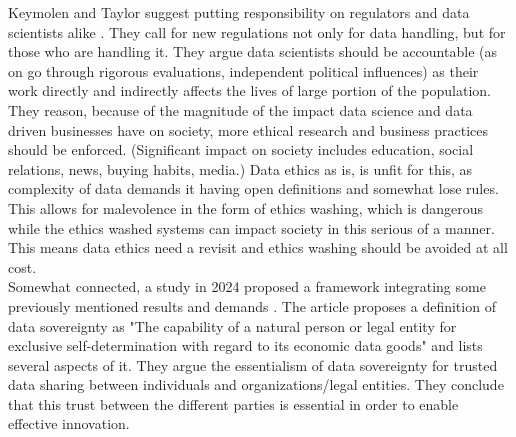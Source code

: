 \documentclass[english, 12pt, a4paper, sci, utf8, a-2b, online]{aaltothesis}
\theoremstyle{change}
\theoremstyle{theoremstyle}
\begin{document}
Keymolen and Taylor suggest putting responsibility on regulators and data scientists alike \cite{keymolen2023data}. They call for new regulations not only for data handling, but for those who are handling it. They argue data scientists should be accountable (as on go through rigorous evaluations, independent political influences) as their work directly and indirectly affects the lives of large portion of the population. They reason, because of the magnitude of the impact data science and data driven businesses have on society, more ethical research and business practices should be enforced. (Significant impact on society includes education, social relations, news, buying habits, media.) Data ethics as is, is unfit for this, as complexity of data demands it having open definitions and somewhat lose rules. This allows for malevolence in the form of ethics washing, which is dangerous while the ethics washed systems can impact society in this serious of a manner. This means data ethics need a revisit and ethics washing should be avoided at all cost.\\

Somewhat connected, a study in 2024 proposed a framework integrating some previously mentioned results and demands \cite{von2024data}. The article proposes a definition of data sovereignty as "The capability of a natural person or legal entity for exclusive self-determination with regard to its economic data goods" and lists several aspects of it. They argue the essentialism of data sovereignty for trusted data sharing between individuals and organizations/legal entities. They conclude that this trust between the different parties is essential in order to enable effective innovation. \\
\end{document}
